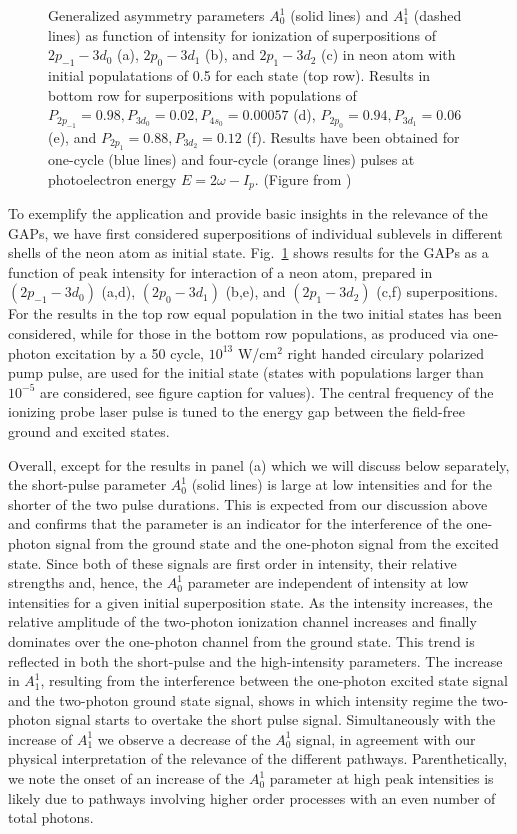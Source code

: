 \begin{figure}[!ht]
\caption{
Generalized asymmetry parameters $A_0^1$ (solid lines) and $A_1^1$ (dashed lines) as function of intensity for ionization of  superpositions of $2p_{-1}-3d_0$ (a), $2p_{0}-3d_1$ (b), and $2p_{1}-3d_2$ (c) in neon atom with initial populatations of 0.5 for each state (top row). Results in bottom row for superpositions with populations of $P_{2p_{-1}}=0.98,P_{3d_0}=0.02,P_{4s_0}=0.00057$ (d), $P_{2p_{0}}=0.94,P_{3d_1}=0.06$ (e), and $P_{2p_{1}}=0.88,P_{3d_2}=0.12$ (f). Results have been obtained for one-cycle (blue lines) and four-cycle (orange lines) pulses at photoelectron energy $E = 2\omega-I_p$. (Figure from \cite{venzke2020_GAP})
} 
  \label{fig:Neon-1-photon}
\end{figure}

To exemplify the application and provide basic insights in the relevance of the GAPs, we have first considered superpositions of individual sublevels in different shells of the neon atom as initial state. Fig.~\ref{fig:Neon-1-photon} shows results for the GAPs as a function of peak intensity for interaction of a neon atom, prepared in $(2p_{-1}-3d_0)$ (a,d), $(2p_{0}-3d_1)$ (b,e),  and $(2p_{1}-3d_2)$ (c,f) superpositions. For the results in the top row equal population in the two initial states has been considered, while for those in the bottom row populations, as produced via one-photon excitation by a 50 cycle, $10^{13}$ W/cm$^2$ right handed circulary polarized pump pulse, are used for the initial state  
(states with populations larger than $10^{-5}$ are considered, see figure caption for values). The central frequency of the ionizing probe laser pulse is tuned to the energy gap between the field-free ground and excited states. 

Overall, except for the results in panel (a) which we will discuss below separately, the short-pulse parameter $A_0^1$ (solid lines) is large at low intensities and for the shorter of the two pulse durations. This is expected from our discussion above and confirms that the parameter is an indicator for the interference of the one-photon signal from the ground state and the one-photon signal from the excited state. Since both of these signals
are 
first order in intensity, their relative strengths and, hence, the $A_0^1$ parameter are independent of intensity at low intensities for a given initial superposition state. As the intensity increases, the relative amplitude of the two-photon ionization channel increases and finally dominates over the one-photon channel from the ground state. This trend is reflected in both the short-pulse and the high-intensity parameters. The increase in $A_1^1$, resulting from the interference between the one-photon excited state signal and the two-photon ground state signal, shows in which intensity regime the two-photon signal starts to overtake the short pulse signal. Simultaneously with the increase of $A_1^1$ we observe a decrease of the $A_0^1$ signal, in agreement with our physical interpretation of the relevance of the different pathways. Parenthetically, we note the onset of an increase of the $A_0^1$ parameter at high peak intensities is likely due to pathways involving higher order processes with an even number of total photons.

